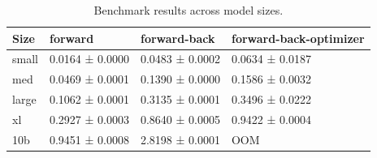 \begin{table}
\caption{Benchmark results across model sizes.}
\label{tab:model-benchmark-results}
\begin{tabular}{llll}
\toprule
Size & forward & forward-back & forward-back-optimizer \\
\midrule
small & 0.0164 ± 0.0000 & 0.0483 ± 0.0002 & 0.0634 ± 0.0187 \\
med & 0.0469 ± 0.0001 & 0.1390 ± 0.0000 & 0.1586 ± 0.0032 \\
large & 0.1062 ± 0.0001 & 0.3135 ± 0.0001 & 0.3496 ± 0.0222 \\
xl & 0.2927 ± 0.0003 & 0.8640 ± 0.0005 & 0.9422 ± 0.0004 \\
10b & 0.9451 ± 0.0008 & 2.8198 ± 0.0001 & OOM \\
\bottomrule
\end{tabular}
\end{table}
